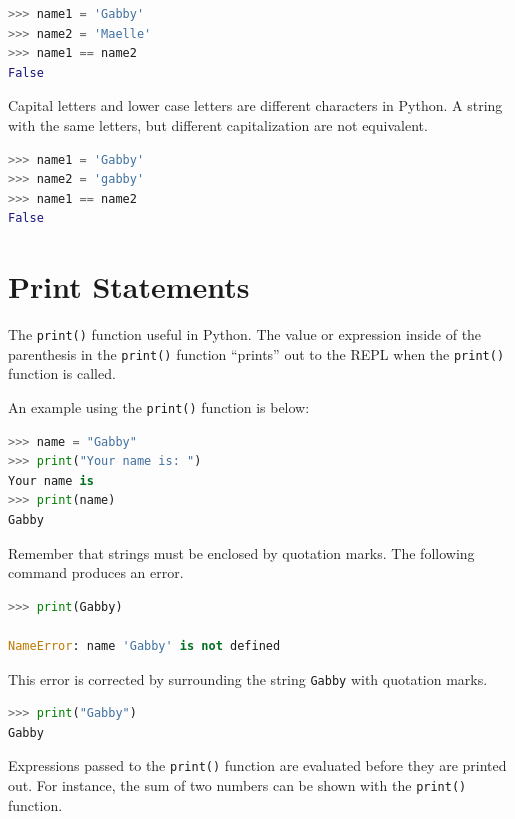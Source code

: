 \documentclass{book}
\begin{document}
\begin{lstlisting}[language=Python]
>>> name1 = 'Gabby'
>>> name2 = 'Maelle'
>>> name1 == name2
False
\end{lstlisting}

Capital letters and lower case letters are different characters in
Python. A string with the same letters, but different capitalization are
not equivalent.

\begin{lstlisting}[language=Python]
>>> name1 = 'Gabby'
>>> name2 = 'gabby'
>>> name1 == name2
False
\end{lstlisting}
    




    
        \section{Print Statements}\label{print-statements}
    




    
        The \lstinline!print()! function useful in Python. The value or
expression inside of the parenthesis in the \lstinline!print()! function
``prints'' out to the REPL when the \lstinline!print()! function is
called.

An example using the \lstinline!print()! function is below:

\begin{lstlisting}[language=Python]
>>> name = "Gabby"
>>> print("Your name is: ")
Your name is
>>> print(name)
Gabby
\end{lstlisting}

Remember that strings must be enclosed by quotation marks. The following
command produces an error.

\begin{lstlisting}[language=Python]
>>> print(Gabby)

NameError: name 'Gabby' is not defined
\end{lstlisting}

This error is corrected by surrounding the string \lstinline!Gabby! with
quotation marks.

\begin{lstlisting}[language=Python]
>>> print("Gabby")
Gabby
\end{lstlisting}
    




    
        Expressions passed to the \lstinline!print()! function are evaluated
before they are printed out. For instance, the sum of two numbers can be
shown with the \lstinline!print()! function.
\end{document}
